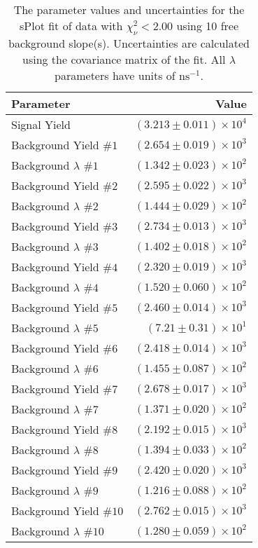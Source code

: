 
\begin{table}
    \begin{center}
        \begin{tabular}{lr}\toprule
            Parameter & Value \\\midrule
            Signal Yield & $(3.213 \pm 0.011) \times 10^{4}$ \\
            Background Yield $\#1$ & $(2.654 \pm 0.019) \times 10^{3}$ \\
            Background $\lambda$ $\#1$ & $(1.342 \pm 0.023) \times 10^{2}$ \\
            Background Yield $\#2$ & $(2.595 \pm 0.022) \times 10^{3}$ \\
            Background $\lambda$ $\#2$ & $(1.444 \pm 0.029) \times 10^{2}$ \\
            Background Yield $\#3$ & $(2.734 \pm 0.013) \times 10^{3}$ \\
            Background $\lambda$ $\#3$ & $(1.402 \pm 0.018) \times 10^{2}$ \\
            Background Yield $\#4$ & $(2.320 \pm 0.019) \times 10^{3}$ \\
            Background $\lambda$ $\#4$ & $(1.520 \pm 0.060) \times 10^{2}$ \\
            Background Yield $\#5$ & $(2.460 \pm 0.014) \times 10^{3}$ \\
            Background $\lambda$ $\#5$ & $(7.21 \pm 0.31) \times 10^{1}$ \\
            Background Yield $\#6$ & $(2.418 \pm 0.014) \times 10^{3}$ \\
            Background $\lambda$ $\#6$ & $(1.455 \pm 0.087) \times 10^{2}$ \\
            Background Yield $\#7$ & $(2.678 \pm 0.017) \times 10^{3}$ \\
            Background $\lambda$ $\#7$ & $(1.371 \pm 0.020) \times 10^{2}$ \\
            Background Yield $\#8$ & $(2.192 \pm 0.015) \times 10^{3}$ \\
            Background $\lambda$ $\#8$ & $(1.394 \pm 0.033) \times 10^{2}$ \\
            Background Yield $\#9$ & $(2.420 \pm 0.020) \times 10^{3}$ \\
            Background $\lambda$ $\#9$ & $(1.216 \pm 0.088) \times 10^{2}$ \\
            Background Yield $\#10$ & $(2.762 \pm 0.015) \times 10^{3}$ \\
            Background $\lambda$ $\#10$ & $(1.280 \pm 0.059) \times 10^{2}$ \\\bottomrule
        \end{tabular}
        \caption{The parameter values and uncertainties for the sPlot fit of data with $\chi^2_\nu < 2.00$ using 10 free background slope(s). Uncertainties are calculated using the covariance matrix of the fit. All $\lambda$ parameters have units of $\si{\nano\second}^{-1}$.}
    \end{center}
\end{table}
